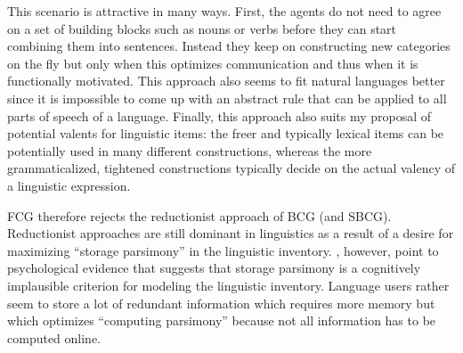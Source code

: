 This scenario is attractive in many ways. First, the agents do not need to agree on a set of building blocks such as nouns or verbs before they can start combining them into sentences. Instead they keep on constructing new categories on the fly but only when this optimizes communication and thus when it is functionally motivated. This approach also seems to fit natural languages better since it is impossible to come up with an abstract rule that can be applied to all parts of speech of a language. Finally, this approach also suits my proposal of potential valents for linguistic items: the freer and typically lexical items can be potentially used in many different constructions, whereas the more grammaticalized, tightened constructions typically decide on the actual valency of a linguistic expression.

FCG therefore rejects the reductionist approach of BCG (and SBCG). Reductionist approaches are still dominant in linguistics as a result of a desire for maximizing ``storage parsimony'' in the linguistic inventory. \citet[278]{croft04cognitive}, however, point to psychological evidence that suggests that storage parsimony is a cognitively implausible criterion for modeling the linguistic inventory. Language users rather seem to store a lot of redundant information which requires more memory but which optimizes  ``computing parsimony'' because not all information has to be computed online.



